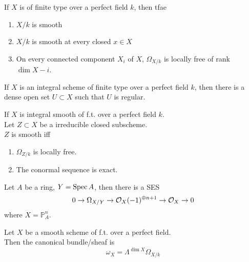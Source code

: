 \documentclass[../main.tex]{subfiles}
\begin{document}
\begin{propo}


If $X$ is of finite type over a perfect field $k$, then tfae

\begin{enumerate}
\item $X /k$ is smooth
\item $X /k$ is smooth at every closed $x\in X$ 
\item On every connected component $X_i$ of $X$, $\Omega_{ X /k} $ is locally free of rank $\dim X-i$.
\end{enumerate}
\end{propo}
\begin{crly}
If $X$ is an integral scheme of finite type over a perfect field $k$, then there is a dense open set $U \subset X$ such that $U$ is regular.
\end{crly}
\begin{thm}
	If $X$ is integral smooth of f.t. over a perfect field $k$.\\
	Let $Z \subset X$ be a  irreducible closed subscheme.\\
	$Z$ is smooth iff
	\begin{enumerate}
	\item $\Omega_{Z /k} $ is locally free.
	\item The conormal sequence is exact.
	\end{enumerate}
\end{thm}
\begin{thm}
Let $A$ be a ring, $Y= \operatorname{Spec} A$, then there is a SES
\[ 
0 \to \Omega_{X /Y} \to \mathcal{O}_X( -1)^{\oplus n+1}\to \mathcal{O}_X \to 0
\]
where $X= \mathbb{P}_A^{n}$.
\end{thm}
\begin{defn}
	Let $X$ be a smooth scheme of f.t. over a perfect field.\\
	Then the canonical bundle/sheaf is
	\[ 
	\omega_X = \Lambda^{\dim X}\Omega_{X /k} 
	\]
	
\end{defn}
\end{document}
